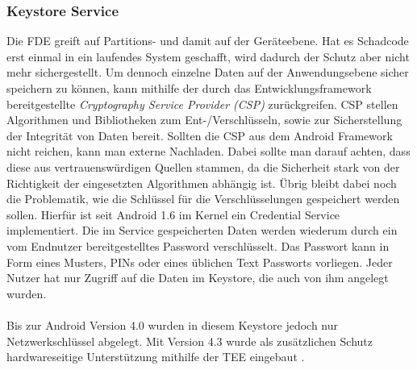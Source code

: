 	\subsubsection{Keystore Service}
	Die FDE greift auf Partitions- und damit auf der Geräteebene. Hat es Schadcode erst einmal in ein laufendes System geschafft, wird dadurch der Schutz aber nicht mehr sichergestellt. Um dennoch einzelne Daten auf der Anwendungsebene sicher speichern zu können, kann mithilfe der durch das Entwicklungsframework bereitgestellte \textit{Cryptography Service Provider (CSP)} zurückgreifen. CSP stellen Algorithmen und Bibliotheken zum Ent-/Verschlüsseln, sowie zur Sicherstellung der Integrität von Daten bereit. Sollten die CSP aus dem Android Framework nicht reichen, kann man externe Nachladen. Dabei sollte man darauf achten, dass diese aus vertrauenswürdigen Quellen stammen, da die Sicherheit stark von der Richtigkeit der eingesetzten Algorithmen abhängig ist. Übrig bleibt dabei noch die Problematik, wie die Schlüssel für die Verschlüsselungen gespeichert werden sollen. Hierfür ist seit Android 1.6 im Kernel ein Credential Service implementiert. Die im Service gespeicherten Daten werden wiederum durch ein vom Endnutzer bereitgestelltes Password verschlüsselt. Das Passwort kann in Form eines Musters, PINs oder eines üblichen Text Passworts vorliegen. Jeder Nutzer hat nur Zugriff auf die Daten im Keystore, die auch von ihm angelegt wurden.\\\\	
	Bis zur Android Version 4.0 wurden in diesem Keystore jedoch nur Netzwerkschlüssel abgelegt. Mit Version 4.3 wurde als zusätzlichen Schutz hardwareseitige Unterstützung mithilfe der TEE eingebaut \cite[S. 175]{Drake2014}.
